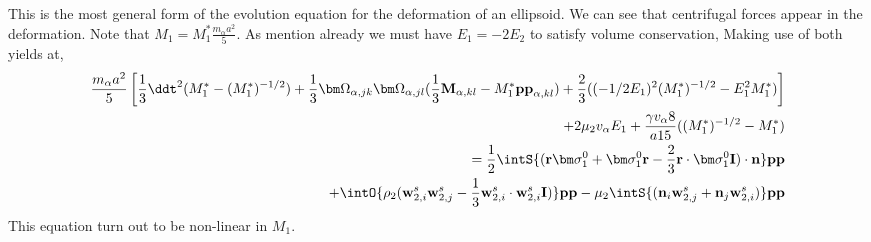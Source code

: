 This is the most general form of the evolution equation for the deformation of an ellipsoid. 
We can see that centrifugal forces appear in the deformation. 
Note that $M_1 = M_1^* \frac{m_\alpha a^2}{5}$. 
As mention already we must have $E_1 = - 2E_2$ to satisfy volume conservation,
Making use of both yields at, 
\begin{align*}
    \frac{m_\alpha a^2}{5} \left[\frac{1}{3}\ddt^2 (M_1^* - (M_1^*)^{-1/2})
    +  
    \frac{1}{3}\bm\Omega_{\alpha,jk}
    \bm\Omega_{\alpha,jl}(
        \frac{1}{3}\textbf{M}_{\alpha,kl}
        -
        M_1^*\textbf{pp}_{\alpha,kl}
    )
    +\frac{2}{3} ((-1/2 E_1)^2 (M_1^*)^{-1/2} - E_1^2 M_1^* ) \right]\\
    + 2 \mu_2 v_\alpha E_1
    + \frac{\gamma v_\alpha 8 }{a15} ((M_1^*)^{-1/2} - M_1^*)
    \\ 
    = 
    \frac{1}{2}\intS{(\textbf{r}\bm\sigma_1^0 + \bm\sigma_1^0\textbf{r} - \frac{2}{3}\textbf{r}\cdot \bm\sigma_1^0 \textbf{I})\cdot \textbf{n}} \textbf{pp}\\
    + \intO{\rho_2 (\textbf{w}_{2,i}^s\textbf{w}_{2,j}^s - \frac{1}{3}\textbf{w}_{2,i}^s\cdot \textbf{w}_{2,i}^s \textbf{I})} \textbf{pp}
    - \mu_2 \intS{(\textbf{n}_i \textbf{w}_{2,j}^s + \textbf{n}_j \textbf{w}_{2,i}^s)} \textbf{pp}\\
\end{align*}
This equation turn out to be non-linear in $M_1$. 

